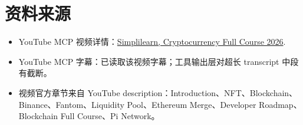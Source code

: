 \documentclass[UTF8,11pt]{ctexart}
\begin{document}
\section{资料来源}

\begin{itemize}
  \item YouTube MCP 视频详情：\href{https://www.youtube.com/watch?v=bRLIeRRV6X4}{Simplilearn, Cryptocurrency Full Course 2026}.
  \item YouTube MCP 字幕：已读取该视频字幕；工具输出层对超长 transcript 中段有截断。
  \item 视频官方章节来自 YouTube description：Introduction、NFT、Blockchain、Binance、Fantom、Liquidity Pool、Ethereum Merge、Developer Roadmap、Blockchain Full Course、Pi Network。
\end{itemize}
\end{document}
